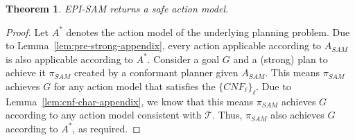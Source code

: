 \documentclass{article}
\theoremstyle{plain}
\newtheorem{theorem}{Theorem}[section]
\theoremstyle{definition}
\theoremstyle{remark}
\theoremstyle{observation}
\newcommand{\pre}{\textit{pre}}
\newcommand{\cnf}{\textit{CNF}}
\newcommand{\realm}{\ensuremath{M^*}\xspace}
\newcommand{\sam}{\textit{SAM}\xspace}
\newcommand{\sgam}{\textit{SGAM}\xspace}
\begin{document}



\begin{theorem}\label{thm:episam-safe-appendix}
EPI-SAM returns a safe action model.
\end{theorem}
\begin{proof}
Let $A^*$ denotes the action model of the underlying planning problem.
Due to Lemma~\ref{lem:pre-strong-appendix}, every action applicable according to $A_\sam$ is also applicable according to $A^*$. 
Consider a goal $G$ and a (strong) plan to achieve it $\pi_\sam$ created by a conformant planner given $A_\sam$. 
This means $\pi_\sam$ achieves $G$ for any action model that satisfies the $\{\cnf_\ell\}_\ell$. 
Due to Lemma~\ref{lem:cnf-char-appendix}, we know that this means $\pi_\sam$ achieves $G$ according to any action model consistent with $\mathcal{T}$. 
Thus, $\pi_\sam$ also achieves $G$ according to $A^*$, as required. 
\end{proof}


\end{document}
